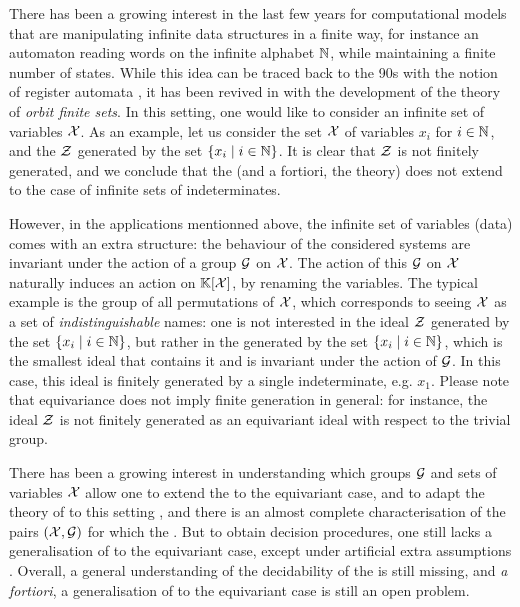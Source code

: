 \AP There has been a growing interest in the last few years for computational
models that are manipulating infinite data structures in a finite way, for
instance an automaton reading words on the infinite alphabet $\mathbb{N}$, while
maintaining a finite number of states. While this idea can be traced back to
the 90s with the notion of register automata \cite{KAFR94}, it has been revived
in with the development of the theory of \emph{orbit finite sets}. In this
setting, one would like to consider an infinite set of variables $\mathcal{X}$. As an
example, let us consider the set $\mathcal{X}$ of variables $x_i$ for $i \in \mathbb{N}$, and
the  $\mathcal{Z}$ generated by the set $\{ x_i \mid i \in \mathbb{N} \}$. It is
clear that $\mathcal{Z}$ is not finitely generated, and we conclude that the
 (and a fortiori, the 
theory) does not extend to the case of infinite sets of indeterminates.

\AP However, in the applications mentionned above, the infinite set of
variables (data) comes with an extra structure: the behaviour of the considered
systems are invariant under the action of a group $\mathcal{G}$ on $\mathcal{X}$. The action
of this $\mathcal{G}$ on $\mathcal{X}$ naturally induces an action on $\mathbb{K}[\mathcal{X}]$, by
renaming the variables. The typical example is the group of all permutations of
$\mathcal{X}$, which corresponds to seeing $\mathcal{X}$ as a set of \emph{indistinguishable}
names: one is not interested in the ideal $\mathcal{Z}$ generated by the set
$\{ x_i \mid i \in \mathbb{N} \}$, but rather in the  generated by
the set $\{ x_i \mid i \in \mathbb{N} \}$, which is the smallest ideal that contains it
and is invariant under the action of $\mathcal{G}$. In this case, this ideal is
finitely generated by a single indeterminate, e.g. $x_1$. Please note that
equivariance does not imply finite generation in general: for instance, the
ideal $\mathcal{Z}$ is not finitely generated as an equivariant ideal with respect to
the trivial group.

\AP There has been a growing interest in understanding which groups $\mathcal{G}$
and sets of variables $\mathcal{X}$ allow one to extend the 
to the equivariant case,
and to adapt the theory of  to this setting \cite{BRDR11,HISU12,HIKRLE18,GHOLAS24,COHEN67},
and there is an almost complete characterisation of the pairs $(\mathcal{X},\mathcal{G})$ for which the  \cite[Theorems 11 and 12]{GHOLAS24}.
But to obtain decision procedures, one still lacks a generalisation of  to the equivariant case, except under artificial extra assumptions \cite[Section 6]{GHOLAS24}.
Overall, a general understanding of the decidability of the  is still missing,
and \emph{a fortiori}, a generalisation of  to the
equivariant case is still an open problem.

